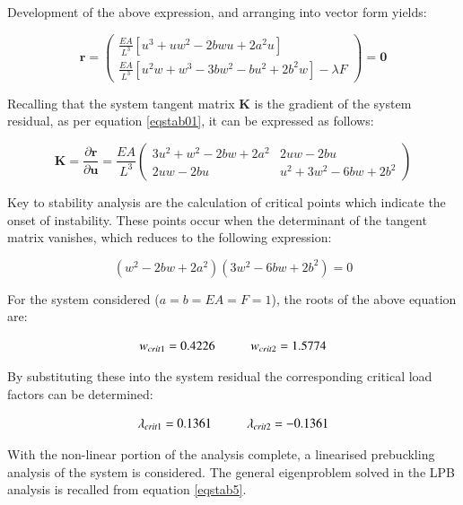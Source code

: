 Development of the above expression, and arranging into vector form yields:

\begin{equation} 
\mathbf{r} = 
\begin{pmatrix}
\frac{EA}{L^3} [u^3+uw^2-2bwu+2a^2u] \\
\frac{EA}{L^3} [u^2w + w^3 - 3bw^2 - bu^2 +2b^2w] - \lambda F
\end{pmatrix}
=
\mathbf{0}
\label{eqapp0_6_1}
\end{equation}

Recalling that the system tangent matrix $\mathbf{K}$ is the gradient of the system residual, as per equation \ref{eqstab01}, it can be expressed as follows:

\begin{equation} 
\mathbf{K} = 
\frac{\partial \mathbf{r}}{\partial \mathbf{u}}
=
\frac{EA}{L^3}
\begin{pmatrix}
3u^2 + w^2 - 2bw +2a^2 & 2uw -2bu \\
2uw - 2bu & u^2 + 3w^2 - 6bw + 2b^2
\end{pmatrix}
\label{eqapp0_7}
\end{equation}

Key to stability analysis are the calculation of critical points which indicate the onset of instability. These points occur when the determinant of the tangent matrix vanishes, which reduces to the following expression:

\begin{equation} 
(w^2 - 2bw +2a^2)
(3w^2 -6bw +2b^2) = 0
\label{eqapp0_8}
\end{equation}

For the system considered ($a=b=EA=F=1$), the roots of the above equation are:

\begin{equation} 
w_{crit1} = 0.4226
\hspace{10mm}
w_{crit2} = 1.5774
\label{eqapp0_9}
\end{equation}

By substituting these into the system residual the corresponding critical load factors can be determined:

\begin{equation} 
\lambda_{crit1} = 0.1361
\hspace{10mm}
\lambda_{crit2} = -0.1361
\label{eqapp0_10}
\end{equation}

With the non-linear portion of the analysis complete, a linearised prebuckling analysis of the system is considered. The general eigenproblem solved in the LPB analysis is recalled from equation \ref{eqstab5}.

